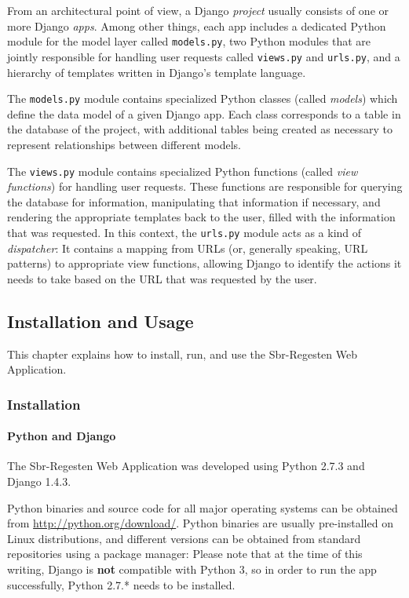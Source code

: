 From an architectural point of view, a Django \emph{project} usually
consists of one or more Django \emph{apps}. Among other things, each
app includes a dedicated Python module for the model layer called
\texttt{models.py}, two Python modules that are jointly responsible
for handling user requests called \texttt{views.py} and
\texttt{urls.py}, and a hierarchy of templates written in Django's
template language.

The \texttt{models.py} module contains specialized Python classes
(called \emph{models}) which define the data model of a given Django
app. Each class corresponds to a table in the database of the project,
with additional tables being created as necessary to represent
relationships between different models.

The \texttt{views.py} module contains specialized Python functions
(called \emph{view functions}) for handling user requests. These
functions are responsible for querying the database for information,
manipulating that information if necessary, and rendering the
appropriate templates back to the user, filled with the information
that was requested. In this context, the \texttt{urls.py} module acts
as a kind of \emph{dispatcher}: It contains a mapping from URLs (or,
generally speaking, URL patterns) to appropriate view functions,
allowing Django to identify the actions it needs to take based on the
URL that was requested by the user.

\subsection{Installation and Usage}
\label{sec:install-run-use}

This chapter explains how to install, run, and use the Sbr-Regesten
Web Application.

\subsubsection{Installation}
\label{sec:install}

\paragraph{Python and Django}
The Sbr-Regesten Web Application was developed using Python 2.7.3 and
Django 1.4.3.

Python binaries and source code for all major operating systems can be
obtained from \url{http://python.org/download/}. Python binaries are
usually pre-installed on Linux distributions, and different versions
can be obtained from standard repositories using a package manager:
Please note that at the time of this writing, Django is \textbf{not}
compatible with Python 3, so in order to run the app successfully,
Python 2.7.* needs to be installed.

